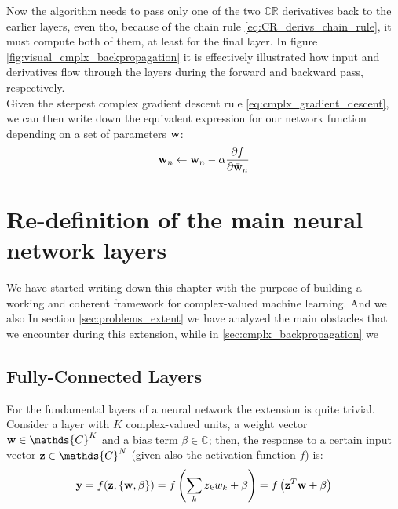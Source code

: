 \documentclass[../main.tex]{subfiles}
\begin{document}
Now the algorithm needs to pass only one of the two $\mathds{CR}$ derivatives back to the earlier layers, even tho, because of the chain rule \ref{eq:CR_derivs_chain_rule}, it must compute both of them, at least for the final layer. In figure \ref{fig:visual_cmplx_backpropagation} it is effectively illustrated how input and derivatives flow through the layers during the forward and backward pass, respectively.\\
Given the steepest complex gradient descent rule \ref{eq:cmplx_gradient_descent}, we can then write down the equivalent expression for our network function depending on a set of parameters $\vb{w}$:
\[ \vb{w}_n \leftarrow \vb{w}_n - \alpha\pdv{f}{\bar{\vb{w}}_n} \]

\section{Re-definition of the main neural network layers}

We have started writing down this chapter with the purpose of building a working and coherent framework for complex-valued machine learning. And we also 
In section \ref{sec:problems_extent} we have analyzed the main obstacles that we encounter during this extension, while in \ref{sec:cmplx_backpropagation} we 

\subsection*{Fully-Connected Layers}
For the fundamental layers of a neural network the extension is quite trivial. Consider a layer with $K$ complex-valued units, a weight vector $\vb{w}\in\mathds{C}^K$ and a bias term $\beta\in\mathds{C}$; then, the response to a certain input vector $\vb{z}\in\mathds{C}^N$ (given also the activation function $f$) is:
\[ \vb{y} = f(\vb{z}, \left\{\vb{w},\beta\right\}) = f\left(\sum_k z_kw_k + \beta\right) = f\left(\vb{z}^T\vb{w} + \beta\right) \]
\end{document}
